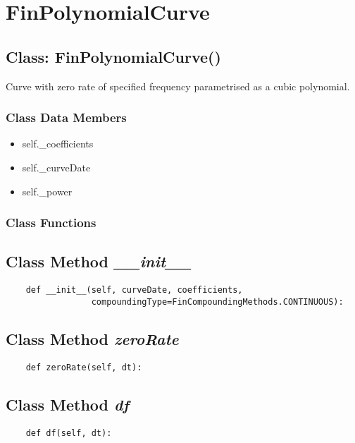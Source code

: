 \documentclass[twoside,11pt]{book}
\begin{document}
\newpage
\section{FinPolynomialCurve}

\subsection{Class: FinPolynomialCurve()}
Curve with zero rate of specified frequency parametrised as a cubic polynomial. 

\subsubsection{Class Data Members}
\begin{itemize}
\item{self.\_coefficients}
\item{self.\_curveDate}
\item{self.\_power}
\end{itemize}

\subsubsection{Class Functions}

\subsection{Class Method {\it \_\_init\_\_}}


\begin{lstlisting}
    def __init__(self, curveDate, coefficients,
                 compoundingType=FinCompoundingMethods.CONTINUOUS):
\end{lstlisting}

\subsection{Class Method {\it zeroRate}}


\begin{lstlisting}
    def zeroRate(self, dt):
\end{lstlisting}

\subsection{Class Method {\it df}}


\begin{lstlisting}
    def df(self, dt):
\end{lstlisting}
\end{document}
